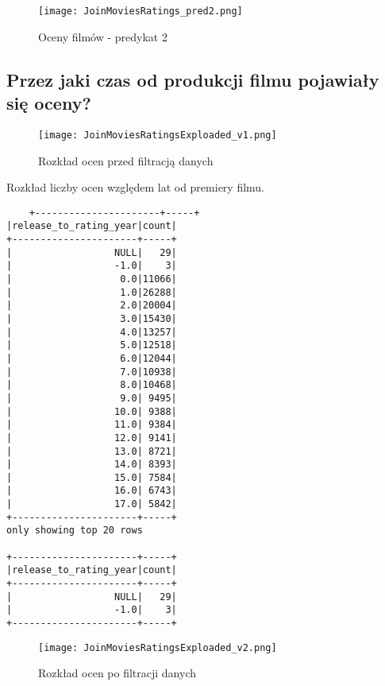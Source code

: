 \documentclass{article}
\begin{document}
\begin{figure}[H]
    \centering
    \texttt{[image: JoinMoviesRatings\_pred2.png]}
    \caption{Oceny filmów - predykat 2}
    \label{fig:movies_ratings_pred2}
\end{figure}

\subsection{Przez jaki czas od produkcji filmu pojawiały się oceny?}
\begin{figure}[H]
        \centering
        \texttt{[image: JoinMoviesRatingsExploaded\_v1.png]}
        \caption{Rozkład ocen przed filtracją danych}
        \label{fig:ratings_time_distribution_v1}
\end{figure}

Rozkład liczby ocen względem lat od premiery filmu.

\begin{verbatim}
    +----------------------+-----+
|release_to_rating_year|count|
+----------------------+-----+
|                  NULL|   29|
|                  -1.0|    3|
|                   0.0|11066|
|                   1.0|26288|
|                   2.0|20004|
|                   3.0|15430|
|                   4.0|13257|
|                   5.0|12518|
|                   6.0|12044|
|                   7.0|10938|
|                   8.0|10468|
|                   9.0| 9495|
|                  10.0| 9388|
|                  11.0| 9384|
|                  12.0| 9141|
|                  13.0| 8721|
|                  14.0| 8393|
|                  15.0| 7584|
|                  16.0| 6743|
|                  17.0| 5842|
+----------------------+-----+
only showing top 20 rows

+----------------------+-----+
|release_to_rating_year|count|
+----------------------+-----+
|                  NULL|   29|
|                  -1.0|    3|
+----------------------+-----+
\end{verbatim}

\begin{figure}[H]
    \centering
    \texttt{[image: JoinMoviesRatingsExploaded\_v2.png]}
    \caption{Rozkład ocen po filtracji danych}
    \label{fig:enter-label}
\end{figure}
\end{document}
